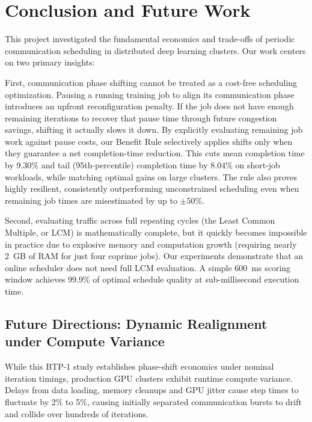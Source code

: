 \documentclass[conference]{IEEEtran}
\begin{document}
\section{Conclusion and Future Work}
\label{sec:conclusion}

This project investigated the fundamental economics and trade-offs of periodic communication scheduling in distributed deep learning clusters. Our work centers on two primary insights:

First, communication phase shifting cannot be treated as a cost-free scheduling optimization. Pausing a running training job to align its communication phase introduces an upfront reconfiguration penalty. If the job does not have enough remaining iterations to recover that pause time through future congestion savings, shifting it actually slows it down. By explicitly evaluating remaining job work against pause costs, our Benefit Rule selectively applies shifts only when they guarantee a net completion-time reduction. This cuts mean completion time by 9.30\% and tail (95th-percentile) completion time by 8.04\% on short-job workloads, while matching optimal gains on large clusters. The rule also proves highly resilient, consistently outperforming unconstrained scheduling even when remaining job times are misestimated by up to $\pm 50\%$.

Second, evaluating traffic across full repeating cycles (the Least Common Multiple, or LCM) is mathematically complete, but it quickly becomes impossible in practice due to explosive memory and computation growth (requiring nearly 2~GB of RAM for just four coprime jobs). Our experiments demonstrate that an online scheduler does not need full LCM evaluation. A simple 600~ms scoring window achieves 99.9\% of optimal schedule quality at sub-millisecond execution time.

\subsection{Future Directions: Dynamic Realignment under Compute Variance}

While this BTP-1 study establishes phase-shift economics under nominal iteration timings, production GPU clusters exhibit runtime compute variance. Delays from data loading, memory cleanups and GPU jitter cause step times to fluctuate by 2\% to 5\%, causing initially separated communication bursts to drift and collide over hundreds of iterations.
\end{document}
